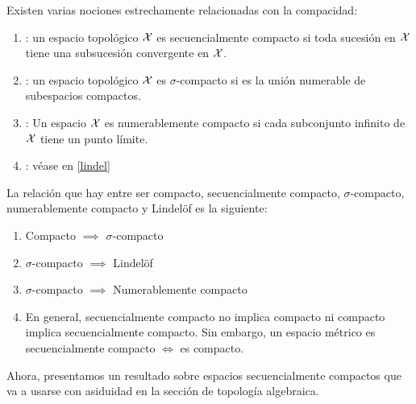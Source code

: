 \begin{defi}[Definiciones] Existen varias nociones estrechamente relacionadas con la compacidad:
	\begin{enumerate}
		\item {}: un espacio topológico	$\mathcal{X}$ es secuencialmente compacto si toda sucesión en $\mathcal{X}$ tiene una subsucesión convergente en $\mathcal{X}$.
		\item {}:  un espacio topológico $\mathcal{X}$ es $\sigma$-compacto si es la unión numerable de subespacios compactos.
		\item {}: Un espacio $\mathcal{X}$ es numerablemente compacto si cada subconjunto infinito de $\mathcal{X}$ tiene un punto límite.
		\item {}: véase en \ref{lindel}
	\end{enumerate}
\end{defi}

\begin{obs}
	\label{comp_obs_relacion_defs_compacidad}
	La relación que hay entre ser compacto, secuencialmente compacto, $\sigma$-compacto, numerablemente compacto y Lindelöf es la siguiente:
	\begin{enumerate}
		\item Compacto $\implies$ $\sigma$-compacto
		\item $\sigma$-compacto $\implies$ Lindelöf
		\item $\sigma$-compacto $\implies$ Numerablemente compacto
		\item En general, secuencialmente compacto no implica compacto ni compacto implica secuencialmente compacto. Sin embargo, un espacio métrico es secuencialmente compacto $\iff$ es compacto. \qedhere
	\end{enumerate}
\end{obs}

Ahora, presentamos un resultado sobre espacios secuencialmente compactos que va a usarse con asiduidad en la sección de topología algebraica.

